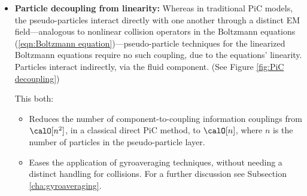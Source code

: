     \begin{itemize}
        \item  {\bf Particle decoupling from linearity:} Whereas in traditional PiC models, the pseudo-particles interact directly with one another through a distinct EM field---analogous to nonlinear collision operators in the Boltzmann equations (\ref{eqn:Boltzmann equation})---pseudo-particle techniques for the linearized Boltzmann equations require no such coupling, due to the equations' linearity. Particles interact indirectly, via the fluid component. (See Figure \ref{fig:PiC decoupling})

        This both:
        \begin{itemize}
            \item  Reduces the number of component-to-coupling information couplings from $\calO[n^{2}]$, in a classical direct PiC method, to $\calO[n]$, where $n$ is the number of particles in the pseudo-particle layer.
            \item  Eases the application of gyroaveraging techniques, without needing a distinct handling for collisions. For a further discussion see Subsection \ref{cha:gyroaveraging}.
        \end{itemize}
        
        \begin{figure}[!ht]
            \centering
            \begin{subfigure}{0.5\textwidth}
                \centering
\end{subfigure}
\end{figure}
\end{itemize}
